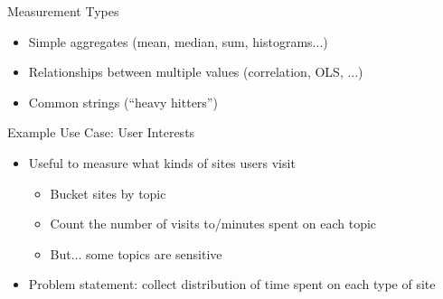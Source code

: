 \documentclass[helvetica]{beamer}
\begin{document}
\begin{frame}{Measurement Types}
  \begin{itemize}
  \item Simple aggregates (mean, median, sum, histograms...)
  \item Relationships between multiple values (correlation, OLS, ...)
  \item Common strings (``heavy hitters'')    
  \end{itemize}
\end{frame}

\begin{frame}{Example Use Case: User Interests}

  \begin{itemize}
  \item Useful to measure what kinds of sites users visit
    \begin{itemize}
    \item Bucket sites by topic
    \item Count the number of visits to/minutes spent on each topic
    \item But... some topics are sensitive
    \end{itemize}
    
  \item Problem statement: collect distribution of time spent on each type of site
  \end{itemize}
\end{frame}
\end{document}
